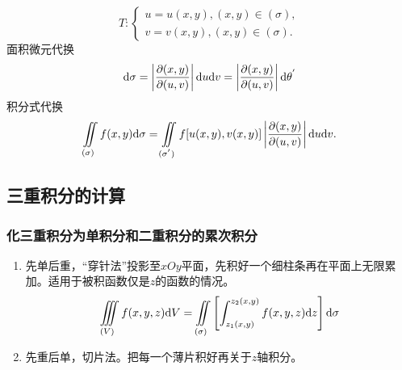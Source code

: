 \begin{enumerate}
\begin{equation}
		T:
		\begin{cases}
			u = u(x,y), (x,y) \in (\sigma),\\
			v = v(x,y), (x,y) \in (\sigma).
		\end{cases}
	\end{equation}
	面积微元代换
	\begin{equation}
		\mathrm{d} \sigma =\left | \dfrac{\partial(x,y)}{\partial(u,v)}\right |\mathrm{d} u \mathrm{d} v = \left | \dfrac{\partial(x,y)}{\partial(u,v)}\right |\mathrm{d} \theta^{'}
	\end{equation}
	积分式代换
	\begin{equation}
		\iint \limits_{(\sigma)} f(x,y) \mathrm{d} \sigma = \iint\limits_{(\sigma^{'})} f[u(x,y),v(x,y)]\left| \dfrac{\partial(x,y)}{\partial(u,v)}\right|\mathrm{d} u \mathrm{d} v.
	\end{equation}
\end{enumerate}
\subsection{三重积分的计算}
\subsubsection{化三重积分为单积分和二重积分的累次积分}
\begin{enumerate}
	\item 先单后重，“穿针法”投影至$xOy$平面，先积好一个细柱条再在平面上无限累加。适用于被积函数仅是$z$的函数的情况。
	\begin{align}
		\iiint \limits_{(V)} f(x,y,z) \mathrm{d} V= \iint\limits_{(\sigma)} \left [ \int_{z_1(x,y)}^{z_2(x,y)} f(x,y,z) \mathrm{d} z \right ] \mathrm{d} \sigma
	\end{align}
	\item 先重后单，切片法。把每一个薄片积好再关于$z$轴积分。
\end{enumerate}
